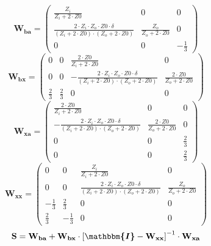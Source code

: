 \[ \mathbf{W_{ba}} = \left(\begin{smallmatrix} \frac{Z_i}{Z_i+2\cdot
Z0} & 0 & 0 \\ \frac{2\cdot Z_i\cdot Z_o\cdot Z0\cdot \delta}{
(Z_i+2\cdot Z0 )\cdot (Z_o+2\cdot Z0 )} & \frac{Z_o}{Z_o+2\cdot Z0} &
0 \\ 0 & 0 & -\frac{1}{3} \end{smallmatrix}\right) \]
\[ \mathbf{W_{bx}} = \left(\begin{smallmatrix} 0 & 0 & \frac{2\cdot
Z0}{Z_i+2\cdot Z0} & 0 \\ 0 & 0 & -\frac{2\cdot Z_i\cdot Z_o\cdot
Z0\cdot \delta}{ (Z_i+2\cdot Z0 )\cdot (Z_o+2\cdot Z0 )} &
\frac{2\cdot Z0}{Z_o+2\cdot Z0} \\ \frac{2}{3} & \frac{2}{3} & 0 & 0
\end{smallmatrix}\right) \]
\[ \mathbf{W_{xa}} = \left(\begin{smallmatrix} \frac{2\cdot
Z0}{Z_i+2\cdot Z0} & 0 & 0 \\ -\frac{2\cdot Z_i\cdot Z_o\cdot Z0\cdot
\delta}{ (Z_i+2\cdot Z0 )\cdot (Z_o+2\cdot Z0 )} & \frac{2\cdot
Z0}{Z_o+2\cdot Z0} & 0 \\ 0 & 0 & \frac{2}{3} \\ 0 & 0 & \frac{2}{3}
\end{smallmatrix}\right) \]
\[ \mathbf{W_{xx}} = \left(\begin{smallmatrix} 0 & 0 &
\frac{Z_i}{Z_i+2\cdot Z0} & 0 \\ 0 & 0 & \frac{2\cdot Z_i\cdot
Z_o\cdot Z0\cdot \delta}{ (Z_i+2\cdot Z0 )\cdot (Z_o+2\cdot Z0 )} &
\frac{Z_o}{Z_o+2\cdot Z0} \\ -\frac{1}{3} & \frac{2}{3} & 0 & 0 \\
\frac{2}{3} & -\frac{1}{3} & 0 & 0 \end{smallmatrix}\right) \]
\[ \mathbf{S}=\mathbf{W_{ba}}+\mathbf{W_{bx}}\cdot\left[
\boldsymbol{\mathbbm{I}}
-\mathbf{W_{xx}}\right]^{-1}\cdot\mathbf{W_{xa}} \]
